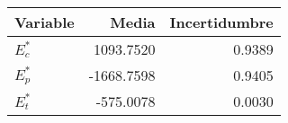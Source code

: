 \begin{tabular}{lrr}
\toprule
Variable & Media & Incertidumbre \\
\midrule
$E_c^*$ & 1093.7520 & 0.9389 \\
$E_p^*$ & -1668.7598 & 0.9405 \\
$E_t^*$ & -575.0078 & 0.0030 \\
\bottomrule
\end{tabular}
